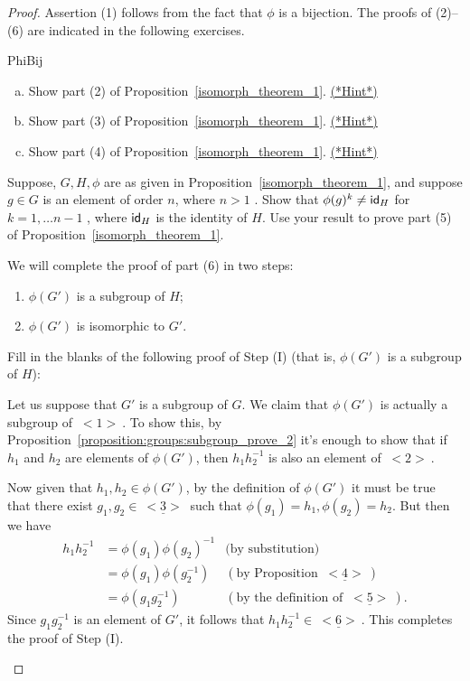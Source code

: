 \begin{proof}
Assertion (1) follows from the fact that $\phi$ is a bijection.  The proofs of (2)--(6) are indicated in the following exercises.

\begin{exercise}{PhiBij}
\begin{enumerate}[(a)]
\item 
Show part (2) of Proposition~\ref{isomorph_theorem_1}.
\hyperref[sec:isomorph:hints]{(*Hint*)}
\item
Show part (3) of Proposition~\ref{isomorph_theorem_1}.
\hyperref[sec:isomorph:hints]{(*Hint*)}
\item
Show part (4) of Proposition~\ref{isomorph_theorem_1}.
\hyperref[sec:isomorph:hints]{(*Hint*)}
\end{enumerate}
\end{exercise} 

\begin{exercise}{}
Suppose, $G, H, \phi$ are as given  in Proposition~\ref{isomorph_theorem_1}, and suppose $g \in G$ is an element of order $n$, where $n>1$ . Show that 
$\phi(g)^k \neq {\sf{i}d}_H$ for $k=1,\ldots n-1$ , where ${\sf{i}d}_H$ is the identity of $H$.  Use your result to prove part (5) of  Proposition~\ref{isomorph_theorem_1}.
\end{exercise}

\noindent
We will complete the proof of part (6) in two steps:
\begin{enumerate}[Step (I):~~]
\item
$\phi(G')$ is a subgroup of $H$;
\item
$\phi(G')$ is isomorphic to $G'$.
\end{enumerate}

\begin{exercise}{} Fill in the blanks of the following proof of Step (I)  (that is, $\phi(G')$ is a subgroup of $H$):
\medskip

Let us suppose that $G'$ is a subgroup of $G$. We claim that $\phi(G')$ is actually a subgroup of \underline{$~<1>~$}.  To show this, by Proposition~\ref{proposition:groups:subgroup_prove_2} it's enough to show that if $h_1$ and $h_2$ are elements of  $\phi(G')$, then $h_1 h_2^{-1}$ is also an element of \underline{$~<2>~$}.

Now given that  $h_1, h_2 \in \phi(G')$, by the definition of $\phi(G')$ it must be true that there exist $g_1, g_2 \in \underline{~<3>~}$ such that $\phi(g_1) = h_1, \phi(g_2) = h_2$. But then we have 
\begin{align*}
h_1 h_2^{-1} &= \phi(g_1) \phi(g_2)^{-1} &\text{(by substitution)}\\
&= \phi(g_1) \phi(g_2^{-1}) &(\text{by Proposition~}\underline{~<4>~})\\
&= \phi(g_1 g_2^{-1}) &(\text{by the definition of }\underline{~<5>~}).
\end{align*}
Since $g_1 g_2^{-1}$ is an element of $G'$, it follows that $h_1 h_2^{-1} \in \underline{~<6>~}$. This completes the proof of Step (I).
\end{exercise}


\end{proof}

